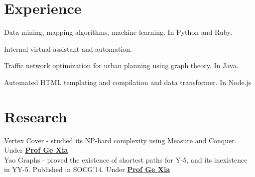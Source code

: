 \documentclass{deedy-resume-openfont}
\begin{document}
\hfill
\begin{minipage}[t]{0.66\textwidth} 


\section{Experience}
\vspace{\topsep} %
\begin{tightemize}
\item Data mining, mapping algorithms, machine learning. In Python and Ruby.
\item Internal virtual assistant and automation.
\end{tightemize}
\sectionsep

\begin{tightemize}
\item Traffic network optimization for urban planning using graph theory. In Java.
\end{tightemize}
\sectionsep

\begin{tightemize}
\item Automated HTML templating and compilation and data transformer. In Node.js
\end{tightemize}
\sectionsep



\section{Research}
Vertex Cover - studied its NP-hard complexity using Measure and Conquer. Under \textbf{\href{http://www.cs.lafayette.edu/~gexia/}{Prof Ge Xia}} \\
\sectionsep
{}
Yao Graphs - proved the existence of shortest paths for Y-5, and its inexistence in YY-5. Published in SOCG'14. Under \textbf{\href{http://www.cs.lafayette.edu/~gexia/}{Prof Ge Xia}}
\sectionsep



\end{minipage}
\end{document}
